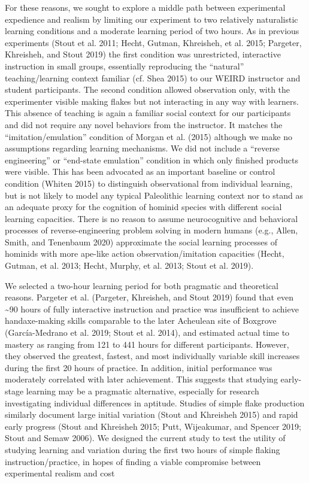\documentclass[smallextended]{svjour3}       %
\begin{document}
For these reasons, we sought to explore a middle path between
experimental expedience and realism by limiting our experiment to two
relatively naturalistic learning conditions and a moderate learning
period of two hours. As in previous experiments (Stout et al. 2011;
Hecht, Gutman, Khreisheh, et al. 2015; Pargeter, Khreisheh, and Stout
2019) the first condition was unrestricted, interactive instruction in
small groups, essentially reproducing the ``natural'' teaching/learning
context familiar (cf. Shea 2015) to our WEIRD instructor and student
participants. The second condition allowed observation only, with the
experimenter visible making flakes but not interacting in any way with
learners. This absence of teaching is again a familiar social context
for our participants and did not require any novel behaviors from the
instructor. It matches the ``imitation/emulation'' condition of Morgan
et al. (2015) although we make no assumptions regarding learning
mechanisms. We did not include a ``reverse engineering'' or ``end-state
emulation'' condition in which only finished products were visible. This
has been advocated as an important baseline or control condition (Whiten
2015) to distinguish observational from individual learning, but is not
likely to model any typical Paleolithic learning context nor to stand as
an adequate proxy for the cognition of hominid species with different
social learning capacities. There is no reason to assume neurocognitive
and behavioral processes of reverse-engineering problem solving in
modern humans (e.g., Allen, Smith, and Tenenbaum 2020) approximate the
social learning processes of hominids with more ape-like action
observation/imitation capacities (Hecht, Gutman, et al. 2013; Hecht,
Murphy, et al. 2013; Stout et al. 2019).

We selected a two-hour learning period for both pragmatic and
theoretical reasons. Pargeter et al. (Pargeter, Khreisheh, and Stout
2019) found that even \textasciitilde90 hours of fully interactive
instruction and practice was insufficient to achieve handaxe-making
skills comparable to the later Acheulean site of Boxgrove
(García-Medrano et al. 2019; Stout et al. 2014), and estimated actual
time to mastery as ranging from 121 to 441 hours for different
participants. However, they observed the greatest, fastest, and most
individually variable skill increases during the first 20 hours of
practice. In addition, initial performance was moderately correlated
with later achievement. This suggests that studying early-stage learning
may be a pragmatic alternative, especially for research investigating
individual differences in aptitude. Studies of simple flake production
similarly document large initial variation (Stout and Khreisheh 2015)
and rapid early progress (Stout and Khreisheh 2015; Putt, Wijeakumar,
and Spencer 2019; Stout and Semaw 2006). We designed the current study
to test the utility of studying learning and variation during the first
two hours of simple flaking instruction/practice, in hopes of finding a
viable compromise between experimental realism and cost
\end{document}
